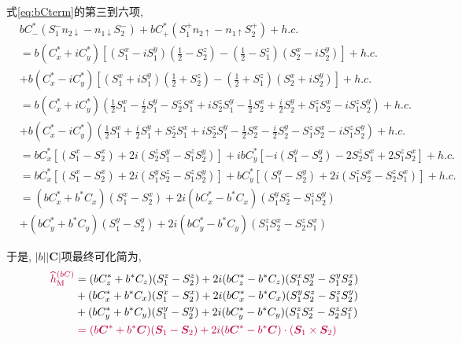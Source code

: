\documentclass[a4paper, 12pt]{article}
\newcommand{\purple}{\textcolor{purple}}
\begin{document}
式\eqref{eq:bCterm}的第三到六项,
\begin{equation}
  \begin{aligned}
    &bC_-^*(S_1^-n_{2\downarrow} - n_{1\downarrow}S_2^-) + bC_+^*(S_1^+n_{2\uparrow} - n_{1\uparrow}S_2^+) + h.c.\\
    &= b(C_x^*+iC_y^*)[(S_1^x - iS_1^y)(\frac{1}{2} - S_2^z) - (\frac{1}{2} - S_1^z)(S_2^x - iS_2^y)] + h.c.\\
    &+ b(C_x^*-iC_y^*)[(S_1^x + iS_1^y)(\frac{1}{2} + S_2^z) - (\frac{1}{2} + S_1^z)(S_2^x + iS_2^y)] + h.c.\\
    &= b(C_x^*+iC_y^*)(\frac{1}{2}S_1^x - \frac{i}{2}S_1^y - S_2^zS_1^x + iS_2^zS_1^y -\frac{1}{2}S_2^x + \frac{i}{2}S_2^y + S_1^zS_2^x - iS_1^zS_2^y) + h.c.\\
    &+ b(C_x^*-iC_y^*)(\frac{1}{2}S_1^x + \frac{i}{2}S_1^y + S_2^zS_1^x + iS_2^zS_1^y -\frac{1}{2}S_2^x - \frac{i}{2}S_2^y - S_1^zS_2^x - iS_1^zS_2^y) + h.c.\\
    &= bC_x^*[(S_1^x - S_2^x) + 2i(S_2^zS_1^y - S_1^zS_2^y)] + ibC_y^*[-i(S_1^y-S_2^y) -2S_2^zS_1^x + 2S_1^zS_2^x] + h.c.\\
    &= bC_x^*[(S_1^x - S_2^x) + 2i(S_1^yS_2^z - S_1^zS_2^y)] + bC_y^*[(S_1^y-S_2^y) + 2i(S_1^zS_2^x - S_2^zS_1^x)] + h.c.\\
    &= (bC_x^* + b^*C_x)(S_1^x - S_2^x) + 2i(bC_x^* - b^*C_x)(S_1^yS_2^z - S_1^zS_2^y)\\
    &+ (bC_y^* + b^*C_y)(S_1^y - S_2^y) + 2i(bC_y^* - b^*C_y)(S_1^zS_2^x - S_2^zS_1^x)
  \end{aligned}
\end{equation}

于是, \(|b||\bm{C}|\)项最终可化简为,
\begin{equation}
  \begin{aligned}
    \purple{\widehat{h}_{\text{M}}^{(bC)}} 
    &= (bC_z^* + b^*C_z)(S_1^z - S_2^z) + 2i(bC_z^*-b^*C_z)(S_1^xS_2^y - S_1^yS_2^x)\\
    &+ (bC_x^* + b^*C_x)(S_1^x - S_2^x) + 2i(bC_x^* - b^*C_x)(S_1^yS_2^z - S_1^zS_2^y)\\
    &+ (bC_y^* + b^*C_y)(S_1^y - S_2^y) + 2i(bC_y^* - b^*C_y)(S_1^zS_2^x - S_2^zS_1^x)\\
    &\hspace*{3pt}\purple{= (b\bm{C}^*+b^*\bm{C})(\bm{S}_1 - \bm{S}_2) + 2i(b\bm{C}^*-b^*\bm{C})\cdot(\bm{S}_1\times\bm{S}_2)}
  \end{aligned}
\end{equation}
\end{document}
